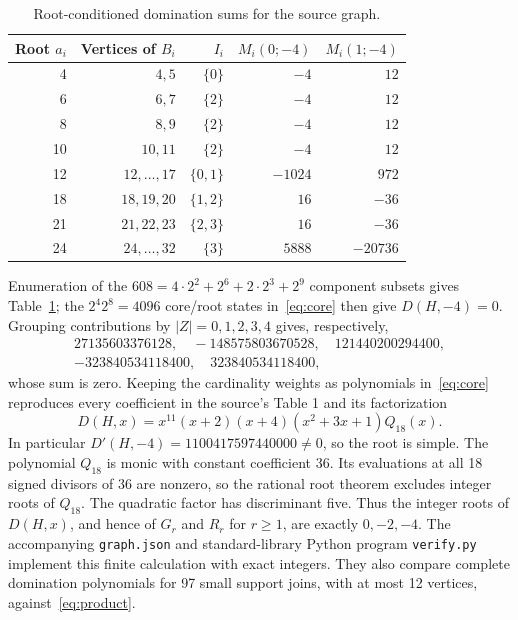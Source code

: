 \documentclass[11pt]{article}
\newcommand{\base}{H}
\begin{document}
\begin{table}[ht]
\centering
\begin{tabular}{@{}rrrrr@{}}
\toprule
Root $a_i$ & Vertices of $B_i$ & $I_i$ & $M_i(0;-4)$ & $M_i(1;-4)$\\
\midrule
4 & $4,5$ & $\{0\}$ & $-4$ & $12$\\
6 & $6,7$ & $\{2\}$ & $-4$ & $12$\\
8 & $8,9$ & $\{2\}$ & $-4$ & $12$\\
10 & $10,11$ & $\{2\}$ & $-4$ & $12$\\
12 & $12,\ldots,17$ & $\{0,1\}$ & $-1024$ & $972$\\
18 & $18,19,20$ & $\{1,2\}$ & $16$ & $-36$\\
21 & $21,22,23$ & $\{2,3\}$ & $16$ & $-36$\\
24 & $24,\ldots,32$ & $\{3\}$ & $5888$ & $-20736$\\
\bottomrule
\end{tabular}
\caption{Root-conditioned domination sums for the source graph.}
\label{tab:messages}
\end{table}

Enumeration of the $608=4\cdot2^2+2^6+2\cdot2^3+2^9$ component
subsets gives Table~\ref{tab:messages}; the $2^4 2^8=4096$ core/root
states in~\eqref{eq:core} then give $D(\base,-4)=0$.
Grouping contributions by $|Z|=0,1,2,3,4$ gives, respectively,
\begin{gather*}
27135603376128,\quad -148575803670528,\quad 121440200294400,\\
-323840534118400,\quad 323840534118400,
\end{gather*}
whose sum is zero. Keeping the cardinality weights as polynomials
in~\eqref{eq:core} reproduces every coefficient in the source's
Table 1 and its factorization
\[
 D(\base,x)=x^{11}(x+2)(x+4)(x^2+3x+1)Q_{18}(x).
\]
In particular $D'(\base,-4)=1100417597440000\ne0$, so the root is simple.
The polynomial $Q_{18}$ is monic with constant coefficient 36.
Its evaluations at all 18 signed divisors of 36 are nonzero, so
the rational root theorem excludes integer roots of $Q_{18}$.
The quadratic factor has discriminant five. Thus the integer roots of $D(\base,x)$,
and hence of $G_r$ and $R_r$ for $r\geq1$, are exactly $0,-2,-4$.
The accompanying \texttt{graph.json} and standard-library Python program
\texttt{verify.py} implement this finite calculation with exact integers.
They also compare complete domination polynomials for 97 small support
joins, with at most 12 vertices, against~\eqref{eq:product}.
\end{document}
